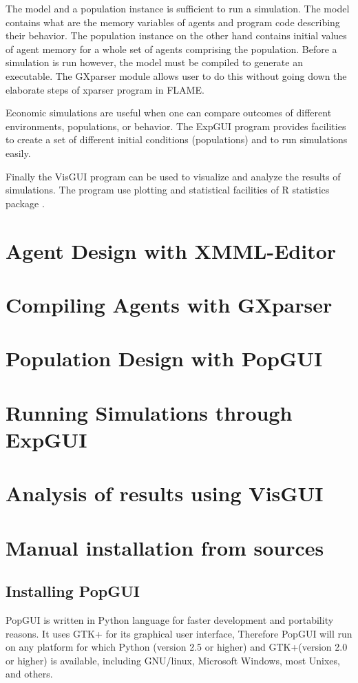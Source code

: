 \documentclass[urop]{socreport}
\begin{document}
The model and a population instance is sufficient to run a simulation. The model contains what are the memory variables of agents and program code describing their behavior. The population instance on the other hand contains initial values of agent memory for a whole set of agents comprising the population. Before a simulation is run however, the model must be compiled to generate an executable. The GXparser module allows user to do this without going down the elaborate steps of xparser program in FLAME. 

Economic simulations are useful when one can compare outcomes of different environments, populations, or behavior. The ExpGUI program provides facilities to create a set of different initial conditions (populations) and to run simulations easily.

Finally the VisGUI program can be used to visualize and analyze the results of simulations. The program use plotting and statistical facilities of R statistics package \citep{Rproject}.
\chapter{Agent Design with XMML-Editor}
\label{ch:xmme}

\chapter{Compiling Agents with GXparser}

\chapter{Population Design with PopGUI}

\chapter{Running Simulations through ExpGUI}

\chapter{Analysis of results using VisGUI}

\appendix
\chapter{Manual installation from sources}
\label{ch:manualinstall}
\section{Installing PopGUI}
PopGUI is written in Python language for faster development and portability reasons. It uses GTK+ for its graphical user interface, Therefore PopGUI will run on any platform for which Python (version 2.5 or higher) and GTK+(version 2.0 or higher) is available, including GNU/linux, Microsoft Windows, most Unixes, and others.
\end{document}
